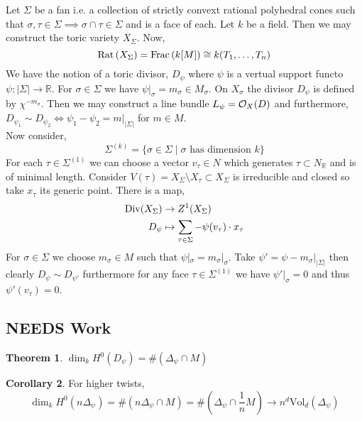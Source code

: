 \documentclass[12pt]{extarticle}
\newcommand{\R}{\mathbb{R}}
\theoremstyle{definition}
\newtheorem{theorem}{Theorem}[section]
\newtheorem{corollary}[theorem]{Corollary}
\newcommand{\Vol}[2]{\mathrm{Vol}_{#1}\left( #2 \right)}
\begin{document}
Let $\Sigma$ be a fan i.e. a collection of strictly convext rational polyhedral cones such that $\sigma, \tau \in \Sigma \implies \sigma \cap \tau \in \Sigma$ and is a face of each. Let $k$ be a field. Then we may construct the toric variety $X_\Sigma$. Now,
\[ \mathrm{Rat} \left( X_\Sigma \right) = \mathrm{Frac} \left( k[M] \right) \cong k(T_1, \dots, T_n) \]
We have the notion of a toric divisor, $D_\psi$ where $\psi$ is a vertual support functo $\psi : |\Sigma | \to \R$. For $\sigma \in \Sigma$ we have $\psi |_\sigma = m_\sigma \in M_\sigma$. On $X_\sigma$ the divisor $D_\psi$ is defined by $\chi^{-m_\sigma}$. Then we may construct a line bundle $L_\psi = \mathcal{O}_{X}(D)$ and furthermore, $D_{\psi_1} \sim D_{\psi_2} \iff \psi_1 - \psi_2 = m |_{|\Sigma|}$ for $m \in M$. 
\bigskip\\
Now consider,
\[ \Sigma^{(k)} = \{ \sigma \in \Sigma \mid \sigma \text{ has dimension } k \} \]
For each $\tau \in \Sigma^{(1)}$ we can choose a vector $v_\tau \in N$ which generates $\tau \subset N_\R$ and is of minimal length. Consider $V(\tau) = X_\Sigma \setminus X_\tau \subset X_\Sigma$ is irreducible and closed so take $x_\tau$ its generic point. 
There is a map,
\begin{align*}
\mathrm{Div}(X_\Sigma) & \to Z^1(X_\Sigma)
\\
D_\psi & \mapsto \sum_{\tau \in \Sigma} - \psi(v_\tau) \cdot x_\tau 
\end{align*}
For $\sigma \in \Sigma$ we choose $m_\sigma \in M$ such that $\psi |_\sigma = m_\sigma |_\sigma$. Take $\psi' = \psi - m_\sigma |_{|\Sigma|}$ then clearly $D_\psi \sim D_{\psi'}$ furthermore for any face $\tau \in \Sigma^{(1)}$ we have $\psi' |_\sigma = 0$ and thus $\psi'(v_\tau) = 0$. 


\subsection{NEEDS Work}

\begin{theorem}
$\dim_k H^0(D_\psi) = \# \left( \Delta_\psi \cap M \right)$
\end{theorem}

\begin{corollary}
For higher twists,
\[ \dim_k H^0(n \Delta_\psi) = \# \left( n \Delta_\psi \cap M \right) = \# \left( \Delta_\psi \cap \frac{1}{n} M \right) \to n^d \Vol{d}{\Delta_\psi} \]
\end{corollary}
\end{document}
